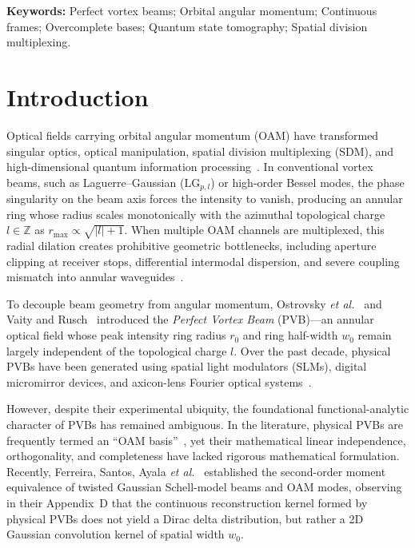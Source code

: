 \documentclass[11pt,a4paper]{article}
\begin{document}
\vspace{0.5em}
\noindent\textbf{Keywords:} Perfect vortex beams; Orbital angular momentum; Continuous frames; Overcomplete bases; Quantum state tomography; Spatial division multiplexing.

\section{Introduction}
\label{sec:intro}

Optical fields carrying orbital angular momentum (OAM) have transformed singular optics, optical manipulation, spatial division multiplexing (SDM), and high-dimensional quantum information processing~\cite{Allen1992,Gbur2016,Mair2001}. In conventional vortex beams, such as Laguerre--Gaussian ($\text{LG}_{p, l}$) or high-order Bessel modes, the phase singularity on the beam axis forces the intensity to vanish, producing an annular ring whose radius scales monotonically with the azimuthal topological charge $l \in \mathbb{Z}$ as $r_{\max} \propto \sqrt{|l| + 1}$. When multiple OAM channels are multiplexed, this radial dilation creates prohibitive geometric bottlenecks, including aperture clipping at receiver stops, differential intermodal dispersion, and severe coupling mismatch into annular waveguides~\cite{Villalba2023}.

To decouple beam geometry from angular momentum, Ostrovsky \emph{et al.}~\cite{Ostrovsky2013} and Vaity and Rusch~\cite{Vaity2015} introduced the \emph{Perfect Vortex Beam} (PVB)---an annular optical field whose peak intensity ring radius $r_0$ and ring half-width $w_0$ remain largely independent of the topological charge $l$. Over the past decade, physical PVBs have been generated using spatial light modulators (SLMs), digital micromirror devices, and axicon-lens Fourier optical systems~\cite{Arrizon2007,Chen2013,Reddy2016}.

However, despite their experimental ubiquity, the foundational functional-analytic character of PVBs has remained ambiguous. In the literature, physical PVBs are frequently termed an ``OAM basis''~\cite{GarciaEscartin2008}, yet their mathematical linear independence, orthogonality, and completeness have lacked rigorous mathematical formulation. Recently, Ferreira, Santos, Ayala \emph{et al.}~\cite{Ferreira2026} established the second-order moment equivalence of twisted Gaussian Schell-model beams and OAM modes, observing in their Appendix~D that the continuous reconstruction kernel formed by physical PVBs does not yield a Dirac delta distribution, but rather a 2D Gaussian convolution kernel of spatial width $w_0$.
\end{document}
